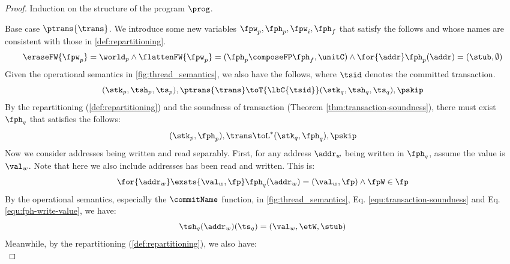 \begin{proof}
Induction on the structure of the program \( \prog \).

Base case \( \ptrans{\trans} \).
We introduce some new variables \( \fpw_{p}, \fph_{p}, \fpw_{i}, \fph_{f} \) that satisfy the follows and whose names are consistent with those in  \ref{def:repartitioning}.
\[
\begin{array}{@{}l@{}}
    \eraseFW{\fpw_{p}} = \world_{p} 
    \land \flattenFW{\fpw_{p}} = (\fph_{p} \composeFP \fph_{f}, \unitC)
    \land \for{\addr} \fph_{p}(\addr) = (\stub, \emptyset) 
\end{array}
\]
Given the operational semantics in \fig \ref{fig:thread_semantics}, we also have the follows, where \( \tsid \) denotes the committed transaction.
\begin{equation}
    \label{equ:commit-current-trans}
    (\stk_{p}, \tsh_{p}, \ts_{p}), \ptrans{\trans} \toT{\lbC{\tsid}} (\stk_{q}, \tsh_{q}, \ts_{q}), \pskip 
\end{equation}
By the repartitioning ( \ref{def:repartitioning}) and the soundness of transaction (Theorem \ref{thm:transaction-soundness}), there must exist \( \fph_{q} \) that satisfies the follows:
\begin{equation}
    \label{equ:transaction-soundness}
    (\stk_{p}, \fph_{p} ), \trans \toL^{*}  (\stk_{q}, \fph_{q} ), \pskip 
\end{equation}
Now we consider addresses being written and read separably.
First, for any address \( \addr_{w} \) being written in \( \fph_{q} \), assume the value is \( \val_{w} \).
Note that here we also include addresses has been read and written.
This is:
\begin{equation}
    \label{equ:fph-write-value}
    \for{\addr_{w}} \exsts{\val_{w}, \fp} 
    \fph_{q}(\addr_{w}) = (\val_{w}, \fp)
    \land \fpW \in \fp
\end{equation}
By the operational semantics, especially the \( \commitName \) function, in  \ref{fig:thread_semantics}, Eq. \eqref{equ:transaction-soundness} and Eq. \eqref{equ:fph-write-value}, we have:
\begin{equation}
    \label{equ:tsh-write-value}
    \tsh_{q}(\addr_{w})(\ts_{q}) = (\val_{w}, \etW, \stub)
\end{equation}
Meanwhile, by the repartitioning ( \ref{def:repartitioning}), we also have:
\begin{equation}

\end{equation}
\end{proof}
